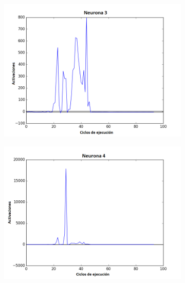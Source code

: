 \begin{figure}[!h]
\begin{subfigure}{0.33\textwidth}
  \includegraphics[width=\linewidth]{Imagenes/Agente2Activaciones/Agente4/Neurona2}
\end{subfigure}
\medskip
\begin{subfigure}{0.33\textwidth}
  \includegraphics[width=\linewidth]{Imagenes/Agente2Activaciones/Agente4/Neurona3}
\end{subfigure}\hfil %
\begin{subfigure}{0.33\textwidth}

\end{subfigure}
\end{figure}
